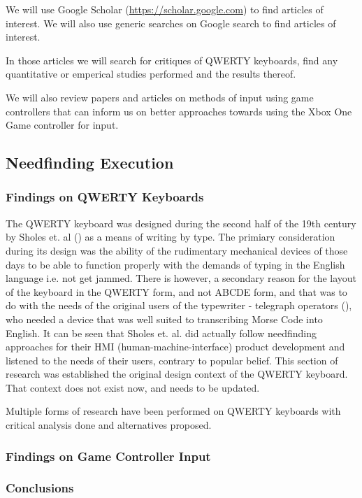 \documentclass[
	letterpaper, %
]{jdf}
\begin{document}
We will use Google Scholar (\url{https://scholar.google.com}) to find articles of interest. We will also use generic searches on Google search to find articles of interest.

In those articles we will search for critiques of QWERTY keyboards, find any quantitative or emperical studies performed and the results thereof.

We will also review papers and articles on methods of input using game controllers that can inform us on better approaches towards using the Xbox One Game controller for input.

\subsection{Needfinding Execution}
\subsubsection{Findings on QWERTY Keyboards}
The QWERTY keyboard was designed during the second half of the 19th century by Sholes et. al (\cite{sholes_glidden_soule_1868}) as a means of writing by type. The primiary consideration during its design was the ability of the rudimentary mechanical devices of those days to be able to function properly with the demands of typing in the English language i.e. not get jammed. There is however, a secondary reason for the layout of the keyboard in the QWERTY form, and not ABCDE form, and that was to do with the needs of the original users of the typewriter - telegraph operators (\cite{stamp_2013}), who needed a device that was well suited to transcribing Morse Code into English. It can be seen that Sholes et. al. did actually follow needfinding approaches for their HMI (human-machine-interface) product development and listened to the needs of their users, contrary to popular belief. This section of research was established the original design context of the QWERTY keyboard. That context does not exist now, and needs to be updated.

Multiple forms of research have been performed on QWERTY keyboards with critical analysis done and alternatives proposed.
\subsubsection{Findings on Game Controller Input}

\subsubsection{Conclusions}
\end{document}
